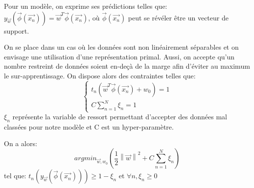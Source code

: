 Pour un modèle, on exprime ses prédictions telles que: $y_{\overrightarrow{w}}(\overrightarrow{\phi}(\overrightarrow{x_n})) = \overrightarrow{w}^T \overrightarrow{\phi}(\overrightarrow{x_n})$, où $\overrightarrow{\phi}(\overrightarrow{x_n})$ peut se révéler être un vecteur de support.

On se place dans un cas où les données sont non linéairement séparables et on envisage une utilisation d'une représentation primal. Aussi, on accepte qu'un nombre restreint de données soient en-deçà de la marge afin d'éviter au maximum le sur-apprentissage.
On dispose alors des contraintes telles que:
\begin{equation}
\begin{cases}
      t_n\left(\overrightarrow{w}^T \overrightarrow{\phi}(\overrightarrow{x_n}) + w_0\right) = 1 \\
      C \sum_{n=1}^N \xi_n = 1
\end{cases}       
\end{equation}
$\xi_n$ représente la variable de ressort permettant d'accepter des données mal classées pour notre modèle et C est un hyper-paramètre.

On a alors:
\begin{equation}
	argmin_{\overrightarrow{w}, w_0} \left(\frac{1}{2} \left\lVert\overrightarrow{w}\right\rVert^2 + C \sum_{n=1}^N \xi_n \right)
\end{equation}
tel que: $t_n\left(y_{\overrightarrow{w}}(\overrightarrow{\phi}(\overrightarrow{x_n}))\right) \geqslant 1 - \xi_n $ et $\forall n, \xi_n \geqslant 0 $

